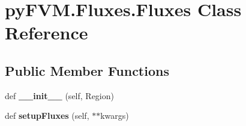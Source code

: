 \hypertarget{classpy_f_v_m_1_1_fluxes_1_1_fluxes}{}\section{py\+F\+V\+M.\+Fluxes.\+Fluxes Class Reference}
\label{classpy_f_v_m_1_1_fluxes_1_1_fluxes}
\subsection*{Public Member Functions}
\begin{DoxyCompactItemize}
\item 
\mbox{\label{classpy_f_v_m_1_1_fluxes_1_1_fluxes_a9411195c8fb5108081c7c1ed21776d80}} 
def {\bfseries \+\_\+\+\_\+init\+\_\+\+\_\+} (self, Region)
\item 
\mbox{\label{classpy_f_v_m_1_1_fluxes_1_1_fluxes_ad9030d9a8294193a342111d2390aaa37}} 
def {\bfseries setup\+Fluxes} (self, $\ast$$\ast$kwargs)
\end{DoxyCompactItemize}
